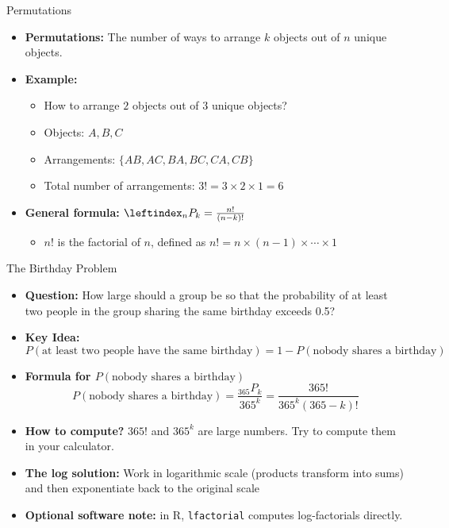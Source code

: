 \documentclass[aspectratio=169]{beamer}
\begin{document}
\begin{frame}{Permutations}
    \begin{itemize}
        \item \textbf{Permutations:} The number of ways to arrange \(k\) objects out of \(n\) unique objects.
        \item \textbf{Example:}
        \begin{itemize}
            \item[$\bullet$] How to arrange $2$ objects out of $3$ unique objects?
            \item[$\bullet$] Objects: \(A, B, C\)
            \item[$\bullet$] Arrangements: \(\{AB, AC, BA, BC, CA, CB\}\)
            \item[$\bullet$] Total number of arrangements: \(3! = 3 \times 2 \times 1 = 6\)
        \end{itemize}
        \item \textbf{General formula:} $\leftindex_{n}{P}_k = \frac{n!}{(n-k)!}$
        \begin{itemize}
            \item[$\bullet$] $n!$ is the factorial of \(n\), defined as \(n! = n \times (n-1) \times \cdots \times 1\)
        \end{itemize}
    \end{itemize}
\end{frame}

\begin{frame}{The Birthday Problem}
    \begin{itemize}
        \item \textbf{Question:} How large should a group be so that the probability of at least two people in the group sharing the same birthday exceeds 0.5?
        \item \textbf{Key Idea:}
        \[
        P(\text{at least two people have the same birthday}) = 1 - P(\text{nobody shares a birthday})
        \]
        \item \textbf{Formula for \(P(\text{nobody shares a birthday})\)}
        \[
        P(\text{nobody shares a birthday}) = \frac{_{365}P_k}{365^k} = \frac{365!}{365^k (365-k)!}
        \]
        \item \textbf{How to compute?} $365!$ and $365^k$ are large numbers. Try to compute them in your calculator.
        \item \textbf{The log solution:} Work in logarithmic scale (products transform into sums) and then exponentiate back to the original scale
        \item \textbf{Optional software note:} in R, \texttt{lfactorial} computes log-factorials directly.
    \end{itemize}
    
\end{frame}
\end{document}
